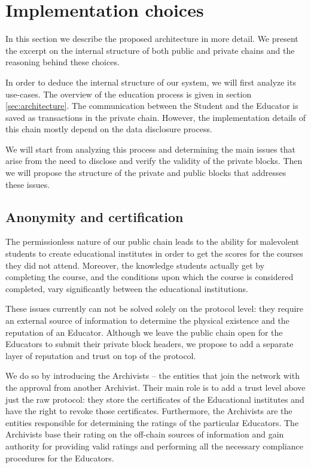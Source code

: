 
\section{Implementation choices}
In this section we describe the proposed architecture in more detail. We present the excerpt on the internal structure of both public and private chains and the reasoning behind these choices.

In order to deduce the internal structure of our system, we will first analyze its use-cases. The overview of the education process is given in section \ref{sec:architecture}. The communication between the Student and the Educator is saved as transactions in the private chain. However, the implementation details of this chain mostly depend on the data disclosure process.

We will start from analyzing this process and determining the main issues that arise from the need to disclose and verify the validity of the private blocks. Then we will propose the structure of the private and public blocks that addresses these issues.

\subsection{Anonymity and certification}
\label{sec:cert}
The permissionless nature of our public chain leads to the ability for malevolent students to create educational institutes in order to get the scores for the courses they did not attend. Moreover, the knowledge students actually get by completing the course, and the conditions upon which the course is considered completed, vary significantly between the educational institutions.

These issues currently can not be solved solely on the protocol level: they require an external source of information to determine the physical existence and the reputation of an Educator. Although we leave the public chain open for the Educators to submit their private block headers, we propose to add a separate layer of reputation and trust on top of the protocol.

We do so by introducing the Archivists -- the entities that join the network with the approval from another Archivist. Their main role is to add a trust level above just the raw protocol: they store the certificates of the Educational institutes and have the right to revoke those certificates. Furthermore, the Archivists are the entities responsible for determining the ratings of the particular Educators. The Archivists base their rating on the off-chain sources of information and gain authority for providing valid ratings and performing all the necessary compliance procedures for the Educators.

